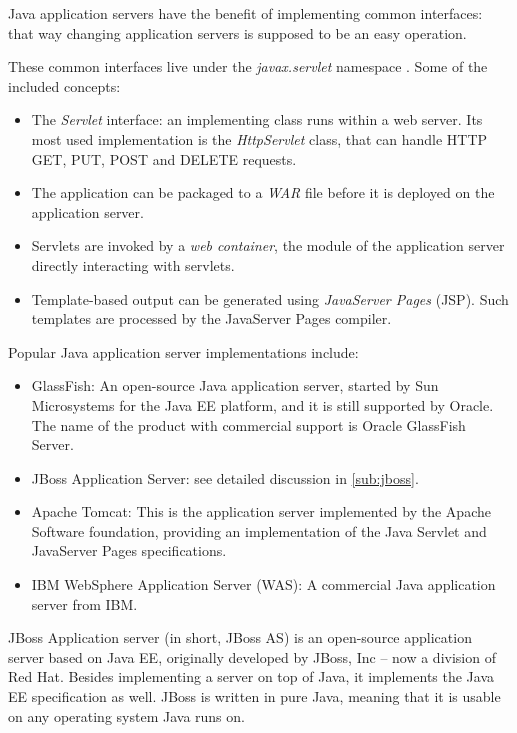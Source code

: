 Java application servers have the benefit of implementing common interfaces:
that way changing application servers is supposed to be an easy operation.

These common interfaces live under the \emph{javax.servlet} namespace \cite{javax-servlet}.
Some of the included concepts:

\begin{itemize}
\item The \emph{Servlet} interface: an implementing class runs within a web
server. Its most used implementation is the \emph{HttpServlet} class, that can
handle HTTP GET, PUT, POST and DELETE requests.
\item The application can be packaged to a \emph{WAR} file before it is deployed
on the application server.
\item Servlets are invoked by a \emph{web container}, the module of the
application server directly interacting with servlets.
\item Template-based output can be generated using \emph{JavaServer Pages}
(JSP). Such templates are processed by the JavaServer Pages compiler.
\end{itemize}

Popular Java application server implementations include:

\begin{itemize}
\item GlassFish: An open-source Java application server, started by Sun
Microsystems for the Java EE platform, and it is still supported by Oracle. The
name of the product with commercial support is Oracle GlassFish Server.
\item JBoss Application Server: see detailed discussion in \autoref{sub:jboss}.
\item Apache Tomcat: This is the application server implemented by the Apache
Software foundation, providing an implementation of the Java Servlet and
JavaServer Pages specifications.
\item IBM WebSphere Application Server (WAS): A commercial Java application
server from IBM.
\end{itemize}

\label{sub:jboss}

JBoss Application server (in short, JBoss AS) is an open-source application server
based on Java EE, originally developed by JBoss, Inc -- now a division of Red
Hat. Besides implementing a server on top of Java, it implements the Java
EE specification as well.  JBoss is written in pure Java, meaning that it is
usable on any operating system Java runs on.

